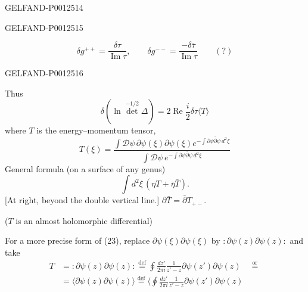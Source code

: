 \begin{GelfandAdjacentEvidence}{GELFAND-P001251}{4}

\end{GelfandAdjacentEvidence}
\begin{GelfandAdjacentEvidence}{GELFAND-P001251}{5}

\begin{equation*}
\delta g^{++}=\frac{\delta\tau}{\operatorname{Im}\tau},
\qquad \delta g^{--}=\frac{-\delta\bar\tau}{\operatorname{Im}\tau}
\qquad (?)
\end{equation*}
\end{GelfandAdjacentEvidence}
\begin{GelfandAdjacentEvidence}{GELFAND-P001251}{6}

\end{GelfandAdjacentEvidence}

Thus
\begin{equation*}
\delta(\ln\det^{-1/2}\Delta)
=2\operatorname{Re}\frac{i}{2}\delta\tau\langle T\rangle\tag{22}
\end{equation*}
where $T$ is the energy–momentum tensor,
\begin{equation*}
T(\xi)=\frac{\int\mathcal D\psi\,\partial\psi(\xi)\partial\psi(\xi)
e^{-\int\partial\psi\bar\partial\psi\,d^2\xi}}
{\int\mathcal D\psi\,e^{-\int\partial\psi\bar\partial\psi\,d^2\xi}}\tag{23}
\end{equation*}
General formula (on a surface of any genus)
\begin{equation*}
\int d^2\xi\,(\eta T+\bar\eta\bar T).\tag{24}
\end{equation*}
[At right, beyond the double vertical line.] $\partial\bar T=\bar\partial T_{+-}$.

($T$ is an almost holomorphic differential)

For a more precise form of (23), replace $\partial\psi(\xi)\partial\psi(\xi)$ by $:\partial\psi(z)\partial\psi(z):$ and take
\begin{equation*}
\begin{aligned}
T&=:\partial\psi(z)\partial\psi(z):
\overset{\mathrm{def}}{=}\oint\frac{dz'}{2\pi i}\frac{1}{z'-z}
\partial\psi(z')\partial\psi(z)\quad\overset{\text{or}}{=}\\
&=\langle\partial\psi(z)\partial\psi(z)\rangle
\overset{\mathrm{def}}{=}\biggl\langle\oint\frac{dz'}{2\pi i}\frac{1}{z'-z}
\partial\psi(z')\partial\psi(z)
\end{aligned}\tag{25}
\end{equation*}


